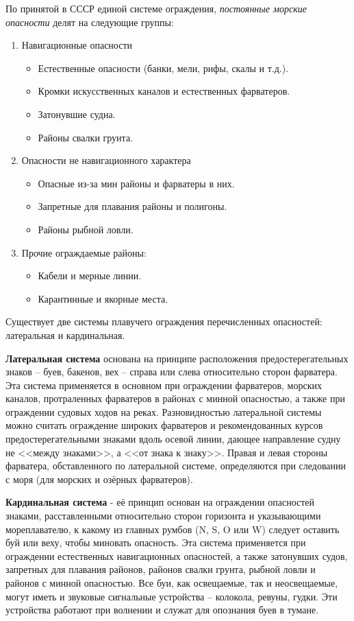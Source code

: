По принятой в СССР единой системе ограждения, \textit{постоянные морские
опасности} делят на следующие группы:

\begin{enumerate}
\item Навигационные опасности
  \begin{itemize}
  \item Естественные опасности (банки, мели, рифы, скалы и т.д.). 
  \item Кромки искусственных каналов и естественных фарватеров.
  \item Затонувшие судна.
  \item Районы свалки грунта.
  \end{itemize}
\item Опасности не навигационного характера
  \begin{itemize}
  \item Опасные из-за мин районы и фарватеры в них.
  \item Запретные для плавания районы и полигоны. 
  \item Районы рыбной ловли. 
  \end{itemize}
\item Прочие ограждаемые районы: 
  \begin{itemize}
  \item Кабели и мерные линии. 
  \item Карантинные и якорные места. 
  \end{itemize}
\end{enumerate}

Существует две системы плавучего ограждения перечисленных опасностей:
латеральная и кардинальная.

\textbf{Латеральная система} основана на
принципе расположения предостерегательных знаков \--- буев, бакенов,
вех \--- справа или слева относительно сторон фарватера. Эта система
применяется в основном при ограждении фарватеров, морских каналов,
протраленных фарватеров в районах с минной опасностью, а также при
ограждении судовых ходов на реках. Разновидностью латеральной системы
можно считать ограждение широких фарватеров и рекомендованных курсов
предостерегательными знаками вдоль осевой линии, дающее направление
судну не <<между знаками>>, а <<от знака к знаку>>. Правая и левая
стороны фарватера, обставленного по латеральной системе, определяются
при следовании с моря (для морских и озёрных фарватеров).

\textbf{Кардинальная система} \-- её
принцип основан на ограждении опасностей знаками, расставленными
относительно сторон горизонта и указывающими мореплавателю, к какому
из главных румбов (N, S, O или W) следует оставить буй или веху, чтобы
миновать опасность. Эта система применяется при ограждении
естественных навигационных опасностей, а также затонувших судов,
запретных для плавания районов, районов свалки грунта, рыбной ловли и
районов с минной опасностью. Все буи, как освещаемые, так и
неосвещаемые, могут иметь и звуковые сигнальные устройства \---
колокола, ревуны, гудки. Эти устройства работают при волнении и служат
для опознания буев в тумане.

